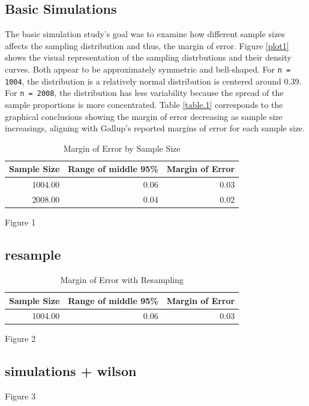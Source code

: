 \documentclass{article}\usepackage[]{graphicx}\usepackage[]{xcolor}
\begin{document}
\begin{multicols}{2}
\subsection{Basic Simulations}
The basic simulation study's goal was to examine how different sample sizes affects the sampling distribution and thus, the margin of error. Figure \ref{plot1} shows the visual representation of the sampling distrbutions and their density curves. Both appear to be approximately symmetric and bell-shaped. For \texttt{n = 1004}, the distribution is a relatively normal distribution is centered around 0.39. For \texttt{n = 2008}, the distribution has less variability because the spread of the sample proportions is more concentrated. Table \ref{table.1} corresponds to the graphical conclusions showing the margin of error decreasing as sample size increasings, aligning with Gallup's reported margins of error for each sample size. 
\begin{table}[H]
\centering
\begingroup\small
\begin{tabular}{rrr}
  \hline
Sample Size & Range of middle 95\% & Margin of Error \\ 
  \hline
1004.00 & 0.06 & 0.03 \\ 
  2008.00 & 0.04 & 0.02 \\ 
   \hline
\end{tabular}
\endgroup
\caption{Margin of Error by Sample Size} 
\label{Table 1}
\end{table}


Figure 1

\subsection{resample}
\begin{table}[H]
\centering
\begingroup\small
\begin{tabular}{rrr}
  \hline
Sample Size & Range of middle 95\% & Margin of Error \\ 
  \hline
1004.00 & 0.06 & 0.03 \\ 
   \hline
\end{tabular}
\endgroup
\caption{Margin of Error with Resampling} 
\label{Table 2}
\end{table}

Figure 2

\subsection{simulations + wilson}
Figure 3


\end{multicols}
\end{document}
